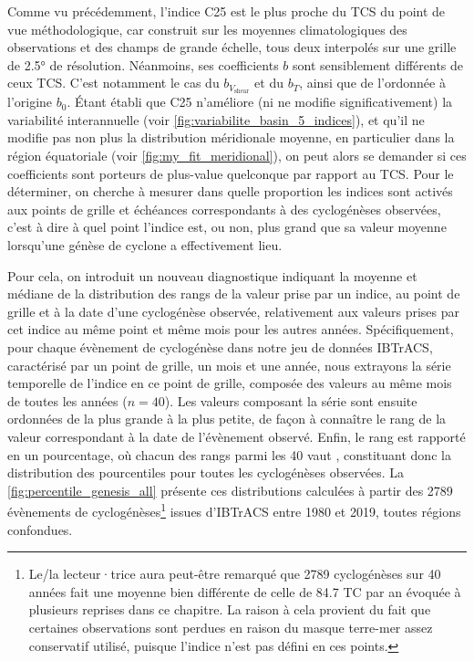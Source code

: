 \documentclass[../main.tex]{subfiles}
\begin{document}
Comme vu précédemment, l'indice C25 est le plus proche du TCS du point de vue méthodologique, car construit sur les moyennes climatologiques des observations et
des champs de grande échelle, tous deux interpolés sur une grille de \ang{2.5} de résolution. Néanmoins, ses coefficients $b$ sont sensiblement différents de
ceux TCS. C'est notamment le cas du $b_{V_{\mathrm{shear}}}$ et du $b_T$, ainsi que de l'ordonnée à l'origine $b_0$. Étant établi que C25 n'améliore (ni ne
modifie significativement) la variabilité interannuelle (voir \cref{fig:variabilite_basin_5_indices}), et qu'il ne modifie pas non plus la distribution
méridionale moyenne, en particulier dans la région équatoriale (voir \cref{fig:my_fit_meridional}), on peut alors se demander si ces coefficients sont porteurs
de plus-value quelconque par rapport au TCS. Pour le déterminer, on cherche à mesurer dans quelle proportion les indices sont activés aux points de grille et
échéances correspondants à des cyclogénèses observées, c'est à dire à quel point l'indice est, ou non, plus grand que sa valeur moyenne lorsqu'une génèse de
cyclone a effectivement lieu.

Pour cela, on introduit un nouveau diagnostique indiquant la moyenne et médiane de la distribution des rangs de la valeur prise par un indice, au point de
grille et à la date d'une cyclogénèse observée, relativement aux valeurs prises par cet indice au même point et même mois pour les autres années.
Spécifiquement, pour chaque évènement de cyclogénèse dans notre jeu de données IBTrACS, caractérisé par un point de grille, un mois et une année, nous extrayons
la série temporelle de l'indice en ce point de grille, composée des valeurs au même mois de toutes les années ($n = \num{40}$). Les valeurs composant la série
sont ensuite ordonnées de la plus grande à la plus petite, de façon à connaître le rang de la valeur correspondant à la date de l'évènement observé. Enfin, le
rang est rapporté en un pourcentage, où chacun des rangs parmi les \num{40} vaut , constituant donc la distribution des pourcentiles pour toutes les
cyclogénèses observées. La \cref{fig:percentile_genesis_all} présente ces distributions calculées à partir des \num{2789} évènements de
cyclogénèses\footnote{Le/la lecteur·trice aura peut-être remarqué que \num{2789} cyclogénèses sur \num{40} années fait une moyenne bien différente de celle de
\num{84.7} TC par an évoquée à plusieurs reprises dans ce chapitre. La raison à cela provient du fait que certaines observations sont perdues en raison du
masque terre-mer assez conservatif utilisé, puisque l'indice n'est pas défini en ces points.} issues d'IBTrACS entre \num{1980} et \num{2019}, toutes régions
confondues.
\end{document}
